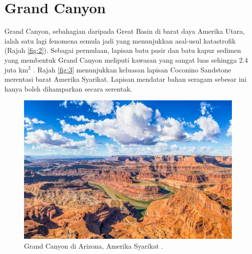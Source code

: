 \documentclass[10pt,twocolumn,letterpaper]{article}
\begin{document}
\section{Grand Canyon}

Grand Canyon, sebahagian daripada Great Basin di barat daya Amerika Utara, ialah satu lagi fenomena semula jadi yang menunjukkan asal-usul katastrofik (Rajah \ref{fig:2}). Sebagai permulaan, lapisan batu pasir dan batu kapur sedimen yang membentuk Grand Canyon meliputi kawasan yang sangat luas sehingga 2.4 juta km$^2$ \cite{21}. Rajah \ref{fig:3} menunjukkan keluasan lapisan Coconino Sandstone merentasi barat Amerika Syarikat. Lapisan mendatar bahan seragam sebesar ini hanya boleh dihamparkan secara serentak.

\begin{figure}[t]
\begin{center}
   \includegraphics[width=1\linewidth]{grand-canyon.jpg}

\end{center}
   \caption{Grand Canyon di Arizona, Amerika Syarikat \cite{49}.}
\label{fig:2}
\label{fig:onecol}
\end{figure}
\end{document}
